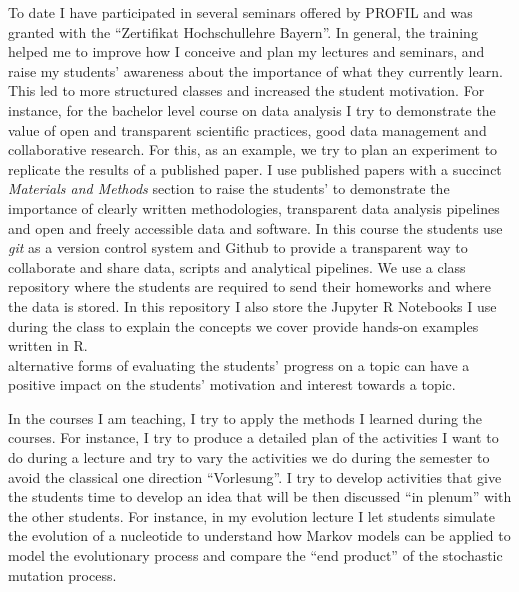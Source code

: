 \documentclass[a4paper,11pt]{article}
\begin{document}
To date I have participated in several seminars offered by PROFIL and was granted with the ``Zertifikat Hochschul\-lehre Bayern''. In general, the training helped me to improve how I conceive and plan my lectures and seminars, and raise my students' awareness about the importance of what they currently learn. This led to more structured classes and increased the student motivation.  For instance, for the bachelor level course on data analysis I try to demonstrate the value of open and transparent scientific practices, good data management and collaborative research. For this, as an example, we try to plan an experiment to replicate the results of a published paper. I use published papers with a succinct \emph{Materials and Methods} section to raise the students' to demonstrate the importance of clearly written methodologies, transparent data analysis pipelines and open and freely accessible data and software. In this course the students use \emph{git} as a version control system and Github to provide a transparent way to collaborate and share data, scripts and analytical pipelines. We use a class repository where the students are required to send their homeworks and where the data is stored. In this repository I also store the Jupyter R Notebooks I use during the class to explain the concepts we cover provide hands-on examples written in R.\\

alternative forms of evaluating the students' progress on a topic can have a positive impact on the students' motivation and interest towards a topic.



In the courses I am teaching, I try to apply the methods I learned during the courses. For instance, I try to produce a detailed plan of the activities I want to do during a lecture and try to vary the activities we do during the semester to avoid the classical one direction ``Vorlesung''. I try to develop activities that give the students time to develop an idea that will be then discussed ``in plenum'' with the other students. For instance, in my evolution lecture I let students simulate the evolution of a nucleotide to understand how Markov models can be applied to model the evolutionary process and compare the ``end product'' of the stochastic mutation process.
\end{document}
